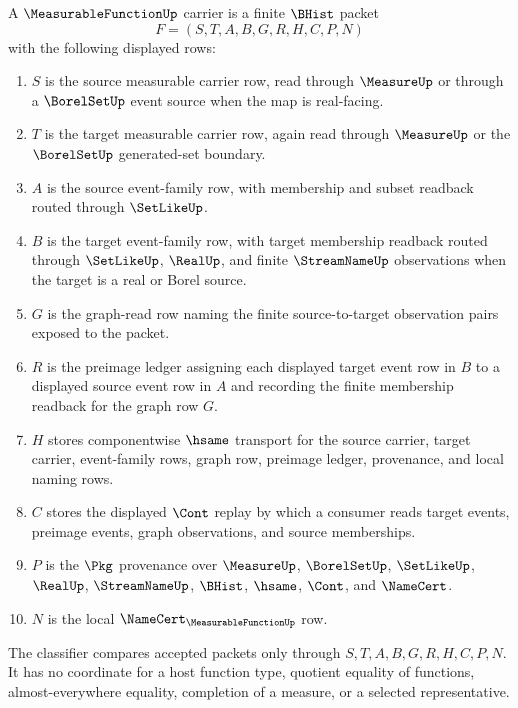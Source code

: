 \begin{definition}
\label{def:measurable-function-carrier}
A $\MeasurableFunctionUp$ carrier is a finite $\BHist$ packet
$$
F=(S,T,A,B,G,R,H,C,P,N)
$$
with the following displayed rows:
\begin{enumerate}
\item $S$ is the source measurable carrier row, read through $\MeasureUp$ or through a $\BorelSetUp$ event source when the map is real-facing.
\item $T$ is the target measurable carrier row, again read through $\MeasureUp$ or the $\BorelSetUp$ generated-set boundary.
\item $A$ is the source event-family row, with membership and subset readback routed through $\SetLikeUp$.
\item $B$ is the target event-family row, with target membership readback routed through $\SetLikeUp$, $\RealUp$, and finite $\StreamNameUp$ observations when the target is a real or Borel source.
\item $G$ is the graph-read row naming the finite source-to-target observation pairs exposed to the packet.
\item $R$ is the preimage ledger assigning each displayed target event row in $B$ to a displayed source event row in $A$ and recording the finite membership readback for the graph row $G$.
\item $H$ stores componentwise $\hsame$ transport for the source carrier, target carrier, event-family rows, graph row, preimage ledger, provenance, and local naming rows.
\item $C$ stores the displayed $\Cont$ replay by which a consumer reads target events, preimage events, graph observations, and source memberships.
\item $P$ is the $\Pkg$ provenance over $\MeasureUp$, $\BorelSetUp$, $\SetLikeUp$, $\RealUp$, $\StreamNameUp$, $\BHist$, $\hsame$, $\Cont$, and $\NameCert$.
\item $N$ is the local $\NameCert_{\MeasurableFunctionUp}$ row.
\end{enumerate}
The classifier compares accepted packets only through $S,T,A,B,G,R,H,C,P,N$. It has no coordinate for a host function type, quotient equality of functions, almost-everywhere equality, completion of a measure, or a selected representative.
\end{definition}

